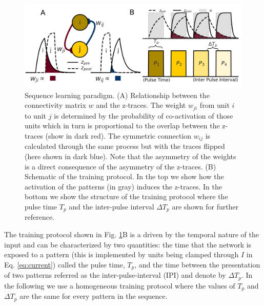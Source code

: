 \documentclass[10pt,a4paper]{article}
\begin{document}
\begin{figure}[H]
\centering
\includegraphics[scale=0.30]{learning_protocol.png}
\caption{Sequence learning paradigm. (A) Relationship between the connectivity matrix $w$ and the z-traces. The weight $w_{ji}$ from unit $i$ to unit $j$ is determined by the probability of co-activation of those units which in turn is proportional to the overlap between the z-traces (show in dark red). The symmetric connection $w_{ij}$ is calculated through the same process but with the traces flipped (here shown in dark blue). Note that the asymmetry of the weights is a direct consequence of the asymmetry of the z-traces. (B) Schematic of the training protocol. In the top we show how the activation of the patterns (in gray) induces the z-traces. In the bottom we show the structure of the training protocol where the pulse time $T_p$ and the inter-pulse interval $\Delta T_p$ are shown for further reference.}
\label{fig:learning}
\end{figure}

The training protocol shown in Fig. \ref{fig:learning}B is a driven by the temporal nature of the input and can be characterized by two quantities: the time that the network is exposed to a pattern (this is implemented by units being clamped through $I$ in Eq. \ref{eq:current}) called the pulse time, $T_p$, and the time between the presentation of two patterns referred as the inter-pulse-interval (IPI) and denote by $\Delta T_p$. In the following we use a homogeneous training protocol where the values of $T_p$ and $\Delta T_p$ are the same for every pattern in the sequence.
\end{document}
